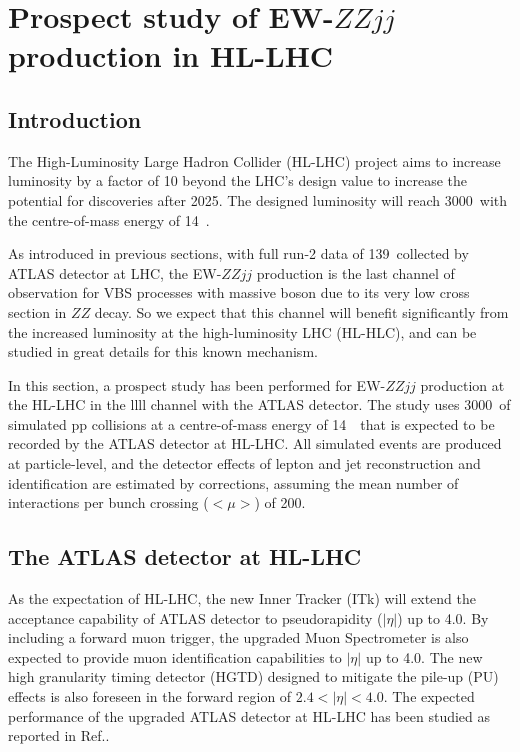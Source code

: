 \section{Prospect study of EW-$ZZjj$ production in HL-LHC}

\subsection{Introduction}
The High-Luminosity Large Hadron Collider (HL-LHC) project aims to increase luminosity by a factor of 10 beyond the LHC’s design value 
to increase the potential for discoveries after 2025.
The designed luminosity will reach 3000~\ifb with the centre-of-mass energy of 14~\tev.

As introduced in previous sections, with full run-2 data of 139~\ifb collected by ATLAS detector at LHC, 
the EW-$ZZjj$ production is the last channel of observation for VBS processes with massive boson 
due to its very low cross section in $ZZ$ decay.
So we expect that this channel will benefit significantly from the increased luminosity at the high-luminosity LHC (HL-HLC),
and can be studied in great details for this known mechanism.

In this section, a prospect study has been performed for EW-$ZZjj$ production at the HL-LHC in the llll channel with the ATLAS detector.
The study uses 3000~\ifb of simulated pp collisions at a centre-of-mass energy of 14~\tev~that is expected to be recorded by the ATLAS detector at HL-LHC.
All simulated events are produced at particle-level, 
and the detector effects of lepton and jet reconstruction and identification are estimated by corrections, 
assuming the mean number of interactions per bunch crossing ($<\mu>$) of 200.

\subsection{The ATLAS detector at HL-LHC}

As the expectation of HL-LHC, the new Inner Tracker (ITk)\cite{Collaboration:2285585}
 will extend the acceptance capability of ATLAS detector to pseudorapidity ($|\eta|$) up to 4.0.
By including a forward muon trigger, the upgraded Muon Spectrometer\cite{Collaboration:2285580} is also expected to provide 
muon identification capabilities to $|\eta|$ up to 4.0.
The new high granularity timing detector (HGTD)\cite{Collaboration:2623663} designed to mitigate the pile-up (PU) effects 
is also foreseen in the forward region of $2.4 < |\eta| < 4.0$.
The expected performance of the upgraded ATLAS detector at HL-LHC has been studied as reported in Ref.\cite{ATL-PHYS-PUB-2016-026}.

